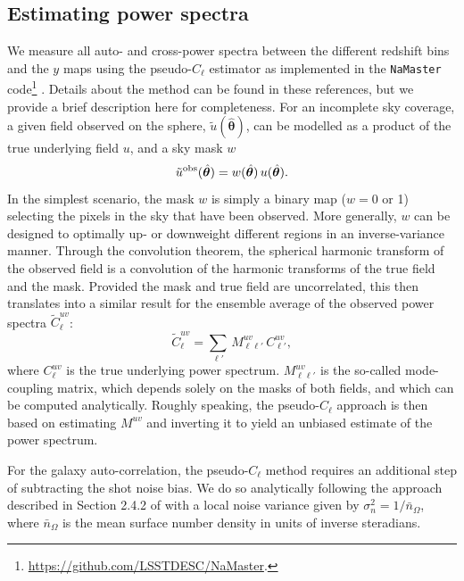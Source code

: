 \documentclass[useAMS,usenatbib]{mn2e}
\newcommand{\nv}{\hat{\boldsymbol{\theta}}}
\begin{document}
  \subsection{Estimating power spectra}\label{ssec:methods.cls}
    We measure all auto- and cross-power spectra between the different redshift bins and the $y$ maps using the pseudo-$C_\ell$ estimator \citep[e.g.][]{2002ApJ...567....2H} as implemented in the {\tt NaMaster} code\footnote{\url{https://github.com/LSSTDESC/NaMaster}.} \citep{2019MNRAS.484.4127A}. Details about the method can be found in these references, but we provide a brief description here for completeness. For an incomplete sky coverage, a given field observed on the sphere, $\tilde{u}(\nv)$, can be modelled as a product of the true underlying field $u$, and a sky mask $w$
    \begin{equation}
      \tilde{u}^{\rm obs}(\nv) = w(\nv)\,u(\nv).
    \end{equation}
    In the simplest scenario, the mask $w$ is simply a binary map ($w=0$ or 1) selecting the pixels in the sky that have been observed. More generally, $w$ can be designed to optimally up- or downweight different regions in an inverse-variance manner. Through the convolution theorem, the spherical harmonic transform of the observed field is a convolution of the harmonic transforms of the true field and the mask. Provided the mask and true field are uncorrelated, this then translates into a similar result for the ensemble average of the observed power spectra $\tilde{C}^{uv}_\ell$:
    \begin{equation}
      \tilde{C}^{uv}_\ell = \sum_{\ell'}\,M^{uv}_{\ell \ell'}\, C^{uv}_{\ell'},
    \end{equation}
    where $C^{uv}_\ell$ is the true underlying power spectrum. $M^{uv}_{\ell \ell'}$ is the so-called mode-coupling matrix, which depends solely on the masks of both fields, and which can be computed analytically. Roughly speaking, the pseudo-$C_\ell$ approach is then based on estimating $M^{uv}$ and inverting it to yield an unbiased estimate of the power spectrum.
    
    For the galaxy auto-correlation, the pseudo-$C_\ell$ method requires an additional step of subtracting the shot noise bias. We do so analytically following the approach described in Section 2.4.2 of \cite{2019MNRAS.484.4127A} with a local noise variance given by $\sigma_n^2=1/\bar{n}_\Omega$, where $\bar{n}_\Omega$ is the mean surface number density in units of inverse steradians.
    
\end{document}
